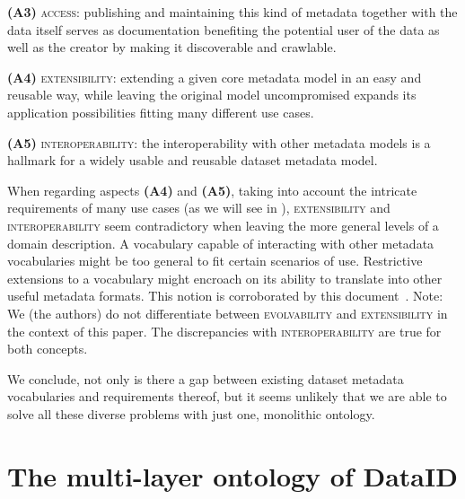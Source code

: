 \documentclass[runningheads,a4paper]{llncs}
\newcommand{\access}{{\scshape access}\xspace}
\newcommand{\extensibility}{{\scshape extensibility}\xspace}
\newcommand{\interoperability}{{\scshape interoperability}\xspace}
\newcommand{\evolvability}{{\scshape evolvability}\xspace}
\begin{document}
\textbf{(A3)} \access: publishing and maintaining
this kind of metadata together with the data itself serves as
documentation benefiting the potential user
of the data as well as the creator by making it discoverable
and crawlable.

\textbf{(A4)} \extensibility: extending a given core metadata model
in an easy and reusable way, while leaving the original model uncompromised expands its application possibilities fitting many
different use cases.

\textbf{(A5)} \interoperability: the interoperability with other metadata models is a hallmark for a widely usable and reusable dataset metadata model.

When regarding aspects \textbf{(A4)} and \textbf{(A5)}, taking into account the intricate requirements of many use cases (as we will see in ), \extensibility and \interoperability seem contradictory when leaving the more general levels of a domain description. A vocabulary capable of interacting with other metadata vocabularies might be too general to fit certain scenarios of use. Restrictive extensions to a vocabulary might encroach on its ability to translate into other useful metadata formats. This notion is corroborated by this document~\cite{ivse}. Note: We (the authors) do not differentiate between \evolvability and \extensibility in the context of this paper. The discrepancies with \interoperability are true for both concepts. 

We conclude, not only is there a gap between existing dataset metadata vocabularies and requirements thereof, but it seems unlikely that we are able to solve all these diverse problems with just one, monolithic ontology.



\section{The multi-layer ontology of DataID} %
\label{dataid}
\end{document}
